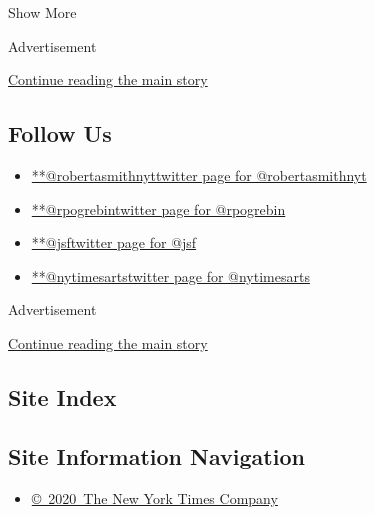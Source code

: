 Show More

Advertisement

\protect\hyperlink{after-mid2}{Continue reading the main story}

\hypertarget{follow-us}{%
\subsection{Follow Us}\label{follow-us}}

\begin{itemize}
\tightlist
\item
  \href{https://twitter.com/robertasmithnyt}{**@robertasmithnyttwitter
  page for @robertasmithnyt}
\item
  \href{https://twitter.com/rpogrebin}{**@rpogrebintwitter page for
  @rpogrebin}
\item
  \href{https://twitter.com/jsf}{**@jsftwitter page for @jsf}
\item
  \href{https://twitter.com/nytimesarts}{**@nytimesartstwitter page for
  @nytimesarts}
\end{itemize}

Advertisement

\protect\hyperlink{after-mktg}{Continue reading the main story}

\hypertarget{site-index}{%
\subsection{Site Index}\label{site-index}}

\hypertarget{site-information-navigation}{%
\subsection{Site Information
Navigation}\label{site-information-navigation}}

\begin{itemize}
\tightlist
\item
  \href{https://help.nytimes.com/hc/en-us/articles/115014792127-Copyright-notice}{©~2020~The
  New York Times Company}
\end{itemize}

